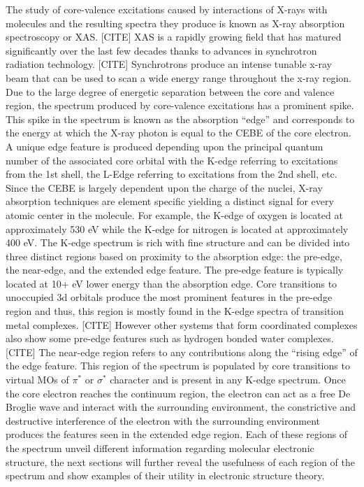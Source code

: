 \documentclass[final]{emory}
\begin{document}
The study of core-valence excitations caused by interactions of X-rays with molecules and the resulting spectra they produce is known as X-ray absorption spectroscopy or XAS. [CITE] XAS is a rapidly growing field that has matured significantly over the last few decades thanks to advances in synchrotron radiation technology. [CITE] Synchrotrons produce an intense tunable x-ray beam that can be used to scan a wide energy range throughout the x-ray region. Due to the large degree of energetic separation between the core and valence region, the spectrum produced by core-valence excitations has a prominent spike. This spike in the spectrum is known as the absorption ``edge'' and corresponds to the energy at which the X-ray photon is equal to the CEBE of the core electron. A unique edge feature is produced depending upon the principal quantum number of the associated core orbital with the K-edge referring to excitations from the 1st shell, the L-Edge referring to excitations from the 2nd shell, etc. Since the CEBE is largely dependent upon the charge of the nuclei, X-ray absorption techniques are element specific yielding a distinct signal for every atomic center in the molecule. For example, the K-edge of oxygen is located at approximately 530 eV while the K-edge for nitrogen is located at approximately 400 eV. The K-edge spectrum is rich with fine structure and can be divided into three distinct regions based on proximity to the absorption edge: the pre-edge, the near-edge, and the extended edge feature. The pre-edge feature is typically located at 10+ eV lower energy than the absorption edge. Core transitions to unoccupied 3d orbitals produce the most prominent features in the pre-edge region and thus, this region is mostly found in the K-edge spectra of transition metal complexes. [CITE] However other systems that form coordinated complexes also show some pre-edge features such as hydrogen bonded water complexes. [CITE] The near-edge region refers to any contributions along the ``rising edge'' of the edge feature. This region of the spectrum is populated by core transitions to virtual MOs of $\pi^*$ or $\sigma^*$ character and is present in any K-edge spectrum. Once the core electron reaches the continuum region, the electron can act as a free De Broglie wave and interact with the surrounding environment, the constrictive and destructive interference of the electron with the surrounding environment produces the features seen in the extended edge region. Each of these regions of the spectrum unveil different information regarding molecular electronic structure, the next sections will further reveal the usefulness of each region of the spectrum and show examples of their utility in electronic structure theory. 
\end{document}

